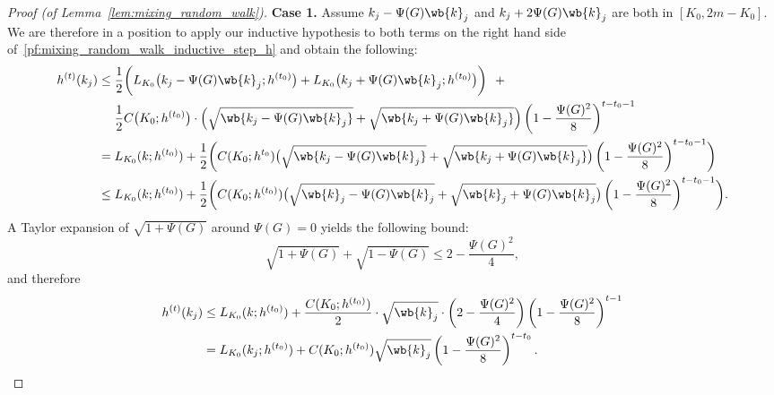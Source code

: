 \documentclass{article}
\newcommand{\1}{\mathbf{1}}
\theoremstyle{definition}
\theoremstyle{remark}
\begin{document}
\begin{proof}[Proof (of Lemma~\ref{lem:mixing_random_walk})]
	\textbf{Case 1.}
	Assume $k_j - \Psi(G) \wb{k}_j$ and $k_j + 2 \Psi(G) \wb{k}_j$ are both in $[K_0,2m  - K_0]$. We are therefore in a position to apply our inductive hypothesis to both terms on the right hand side of~\eqref{pf:mixing_random_walk_inductive_step_h} and obtain the following:
	\begin{align*}
	h^{(t)}(k_j) & \leq \frac{1}{2}\biggl(L_{K_0}\bigl(k_j - \Psi(G) \wb{k}_j; h^{(t_0)}\bigr) + L_{K_0}\bigl(k_j + \Psi(G) \wb{k}_j; h^{(t_0)}\bigr) \biggr) ~~+ \\
	& \quad~ \frac{1}{2}C\bigl(K_0; h^{(t_0)}\bigr) \cdot \Bigl(\sqrt{\wb{k_j - \Psi(G) \wb{k}_j}} + \sqrt{\wb{k_j + \Psi(G) \wb{k}_j}}\Bigr)\left(1 - \frac{\Psi(G)^2}{8}\right)^{t-t_0 - 1} \\
	& = L_{K_0}(k;h^{(t_0)}) + \frac{1}{2}\biggl(C(K_0;h^{t_0})\bigl(\sqrt{\wb{k_j - \Psi(G) \wb{k}_j}} + \sqrt{\wb{k_j + \Psi(G) \wb{k}_j}}\bigr)\left(1 - \frac{\Psi(G)^2}{8}\right)^{t-t_0 - 1} \biggr) \\
	& \leq L_{K_0}(k;h^{(t_0)}) + \frac{1}{2}\biggl(C(K_0;h^{(t_0)})\bigl(\sqrt{\wb{k}_j - \Psi(G) \wb{k}_j} + \sqrt{\wb{k}_j + \Psi(G) \wb{k}_j}\bigr)\left(1 - \frac{\Psi(G)^2}{8}\right)^{t-t_0 - 1} \biggr).
	\end{align*}
	A Taylor expansion of $\sqrt{1 + \Psi(G)}$ around $\Psi(G) = 0$ yields the following bound:
	\begin{equation*}
	\sqrt{1 + \Psi(G)} + \sqrt{1 - \Psi(G)} \leq 2 - \frac{\Psi(G)^2}{4},
	\end{equation*}
	and therefore
	\begin{align*}
	h^{(t)}(k_j) & \leq L_{K_0}(k;h^{(t_0)}) + \frac{C(K_0;h^{(t_0)})}{2}\cdot \sqrt{\wb{k}_j}\cdot\left(2 - \frac{\Psi(G)^2}{4}\right)\left(1 - \frac{\Psi(G)^2}{8}\right)^{t-1} \\
	&= L_{K_0}(k_j;h^{(t_0)}) + C(K_0;h^{(t_0)})\sqrt{\wb{k}_j}\left(1 - \frac{\Psi(G)^2}{8}\right)^{t - t_0}.
	\end{align*}
	

\end{proof}
\end{document}

